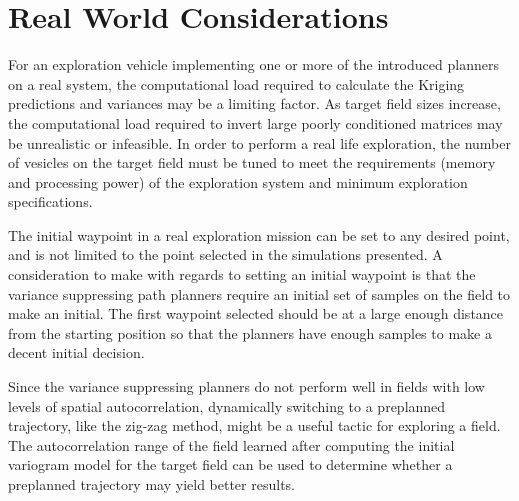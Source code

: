 \section{Real World Considerations}
For an exploration vehicle implementing one or more of the introduced planners on a real system, the computational load required to calculate the Kriging predictions and variances may be a limiting factor. As target field sizes increase, the computational load required to invert large poorly conditioned matrices may be unrealistic or infeasible. In order to perform a real life exploration, the number of vesicles on the target field must be tuned to meet the requirements (memory and processing power) of the exploration system and minimum exploration specifications. 

The initial waypoint in a real exploration mission can be set to any desired point, and is not limited to the point selected in the simulations presented. A consideration to make with regards to setting an initial waypoint is that the variance suppressing path planners require an initial set of samples on the field to make an initial. The first waypoint selected should be at a large enough distance from the starting position so that the planners have enough samples to make a decent initial decision. 

Since the variance suppressing planners do not perform well in fields with low levels of spatial autocorrelation, dynamically switching to a preplanned trajectory, like the zig-zag method, might be a useful tactic for exploring a field. The autocorrelation range of the field learned after computing the initial variogram model for the target field can be used to determine whether a preplanned trajectory may yield better results.
